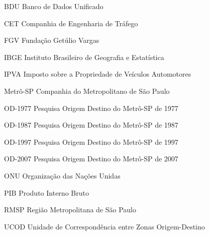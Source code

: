 \documentclass[
  12pt,        %
  openright,      %
  twoside,      %
  a4paper,      %
  english,      %
  brazil        %
]{abntex2}
\begin{document}
\listoffigures*
\cleardoublepage

\listofquadros*
\cleardoublepage

\listofgraficos*
\cleardoublepage

\listoftables*
\cleardoublepage


\begin{siglas}
  \item[BDU] Banco de Dados Unificado
  \item[CET] Companhia de Engenharia de Tráfego
  \item[FGV] Fundação Getúlio Vargas  
  \item[IBGE] Instituto Brasileiro de Geografia e Estatística
  \item[IPVA] Imposto sobre a Propriedade de Veículos Automotores  
  \item[Metrô-SP] Companhia do Metropolitano de São Paulo
  \item[OD-1977] Pesquisa Origem Destino do Metrô-SP de 1977
  \item[OD-1987] Pesquisa Origem Destino do Metrô-SP de 1987
  \item[OD-1997] Pesquisa Origem Destino do Metrô-SP de 1997
  \item[OD-2007] Pesquisa Origem Destino do Metrô-SP de 2007
  \item[ONU] Organização das Nações Unidas
  \item[PIB] Produto Interno Bruto
  \item[RMSP] Região Metropolitana de São Paulo
  \item[UCOD] Unidade de Correspondência entre Zonas Origem-Destino
\end{siglas}

\end{document}
